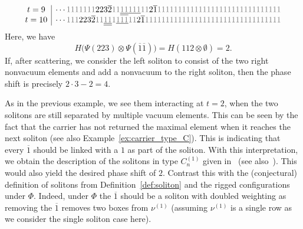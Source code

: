 \documentclass[reqno]{amsart}
\newcommand{\bon}{\overline{1}}
\theoremstyle{plain}
\theoremstyle{definition}
\numberwithin{equation}{section}
\begin{document}
\[{\begin{array}{c|c}
t = 9 & \cdots {\color{gray} 1} {\color{gray} 1} {\color{gray} 1} {\color{gray} 1} {\color{gray} 1} {\color{gray} 1} {\color{gray} 1} 2 2 3 \overline{2} {\color{gray} 1} {\color{gray} 1} \underline{\underline{{\color{gray} 1} {\color{gray} 1}}} \underline{{\color{gray} 1} {\color{gray} 1} {\color{gray} 1}} {\color{gray} 1} {\color{gray} 1} 2 \overline{1} {\color{gray} 1} {\color{gray} 1} {\color{gray} 1} {\color{gray} 1} {\color{gray} 1} {\color{gray} 1} {\color{gray} 1} {\color{gray} 1} {\color{gray} 1} {\color{gray} 1} {\color{gray} 1} {\color{gray} 1} {\color{gray} 1} {\color{gray} 1} {\color{gray} 1} {\color{gray} 1} {\color{gray} 1} {\color{gray} 1} {\color{gray} 1} {\color{gray} 1} {\color{gray} 1} {\color{gray} 1} {\color{gray} 1} {\color{gray} 1} {\color{gray} 1} {\color{gray} 1} {\color{gray} 1} {\color{gray} 1} {\color{gray} 1} {\color{gray} 1} \\
t = 10 & \cdots {\color{gray} 1} {\color{gray} 1} {\color{gray} 1} 2 2 3 \overline{2} {\color{gray} 1} {\color{gray} 1} \underline{\underline{{\color{gray} 1} {\color{gray} 1}}} {\color{gray} 1} \underline{{\color{gray} 1} {\color{gray} 1} {\color{gray} 1}} {\color{gray} 1} {\color{gray} 1} 2 \overline{1} {\color{gray} 1} {\color{gray} 1} {\color{gray} 1} {\color{gray} 1} {\color{gray} 1} {\color{gray} 1} {\color{gray} 1} {\color{gray} 1} {\color{gray} 1} {\color{gray} 1} {\color{gray} 1} {\color{gray} 1} {\color{gray} 1} {\color{gray} 1} {\color{gray} 1} {\color{gray} 1} {\color{gray} 1} {\color{gray} 1} {\color{gray} 1} {\color{gray} 1} {\color{gray} 1} {\color{gray} 1} {\color{gray} 1} {\color{gray} 1} {\color{gray} 1} {\color{gray} 1} {\color{gray} 1} {\color{gray} 1} {\color{gray} 1} {\color{gray} 1} {\color{gray} 1} {\color{gray} 1} {\color{gray} 1} \\
\end{array}}
\]
Here, we have
\[
H\bigl(\Psi(223) \otimes \Psi(\bon\bon)\bigr) = H(112 \otimes \emptyset) = 2.
\]
If, after scattering, we consider the left soliton to consist of the two right nonvacuum elements and add a nonvacuum to the right soliton, then the phase shift is precisely $2 \cdot 3 - 2 = 4$.

As in the previous example, we see them interacting at $t = 2$, when the two solitons are still separated by multiple vacuum elements.
This can be seen by the fact that the carrier has not returned the maximal element when it reaches the next soliton (see also Example~\ref{ex:carrier_type_C}).
This is indicating that every $\bon$ should be linked with a $1$ as part of the soliton.
With this interpretation, we obtain the description of the solitons in type $C_n^{(1)}$ given in~\cite[Sec.~2.3]{HKOTY02} (see also~\cite[Sec.~3.2]{HKT00}).
This would also yield the desired phase shift of $2$.
Contrast this with the (conjectural) definition of solitons from Definition~\ref{def:soliton} and the rigged configurations under $\Phi$.
Indeed, under $\Phi$ the $\bon$ should be a soliton with doubled weighting as removing the $\bon$ removes two boxes from $\nu^{(1)}$ (assuming $\nu^{(1)}$ is a single row as we consider the single soliton case here).
\end{document}
